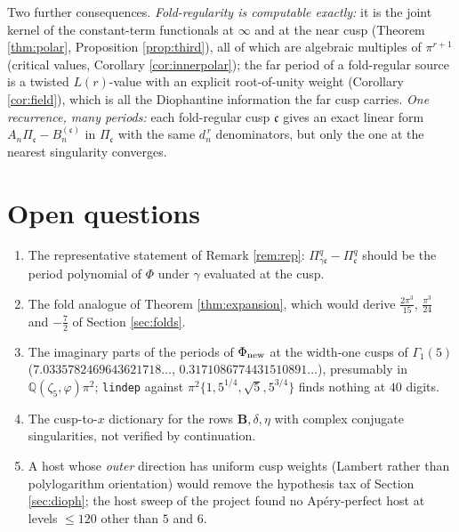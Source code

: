 \documentclass[11pt]{amsart}
\theoremstyle{definition}
\theoremstyle{remark}
\newcommand{\Q}{\mathbb Q}\newcommand{\Z}{\mathbb Z}\newcommand{\R}{\mathbb R}\newcommand{\C}{\mathbb C}\newcommand{\HH}{\mathbb H}
\newcommand{\cc}{\mathfrak c}\newcommand{\Pc}{\Pi_{\cc}}\newcommand{\Pq}{\Pi^{q}}
\newcommand{\Phinew}{\Phi_{\rm new}}\newcommand{\Phican}{\Phi_{\rm can}}
\begin{document}
Two further consequences. \emph{Fold-regularity is computable exactly:} it is the joint kernel of the constant-term functionals at $\infty$ and at the near cusp (Theorem \ref{thm:polar}, Proposition \ref{prop:third}), all of which are algebraic multiples of $\pi^{r+1}$ (critical values, Corollary \ref{cor:innerpolar}); the far period of a fold-regular source is a twisted $L(r)$-value with an explicit root-of-unity weight (Corollary \ref{cor:field}), which is all the Diophantine information the far cusp carries. \emph{One recurrence, many periods:} each fold-regular cusp $\cc$ gives an exact linear form $A_n\Pc-B^{(\cc)}_n$ in $\Pc$ with the same $d_n^{\,r}$ denominators, but only the one at the nearest singularity converges.

\section{Open questions}\label{sec:open}
\begin{enumerate}
\item The representative statement of Remark \ref{rem:rep}: $\Pq_{\gamma\cc}-\Pq_{\cc}$ should be the period polynomial of $\Phi$ under $\gamma$ evaluated at the cusp.
\item The fold analogue of Theorem \ref{thm:expansion}, which would derive $\tfrac{2\pi^3}{15}$, $\tfrac{\pi^3}{24}$ and $-\tfrac72$ of Section \ref{sec:folds}.
\item The imaginary parts of the periods of $\Phinew$ at the width-one cusps of $\Gamma_1(5)$ ($7.0335782469643621718\ldots$, $0.3171086774431510891\ldots$), presumably in $\Q(\zeta_5,\varphi)\pi^2$; \texttt{lindep} against $\pi^2\{1,5^{1/4},\sqrt5,5^{3/4}\}$ finds nothing at $40$ digits.
\item The cusp-to-$x$ dictionary for the rows $\mathbf B,\delta,\eta$ with complex conjugate singularities, not verified by continuation.
\item A host whose \emph{outer} direction has uniform cusp weights (Lambert rather than polylogarithm orientation) would remove the hypothesis tax of Section \ref{sec:dioph}; the host sweep of the project found no Ap\'ery-perfect host at levels $\le120$ other than $5$ and $6$.
\end{enumerate}
\end{document}
